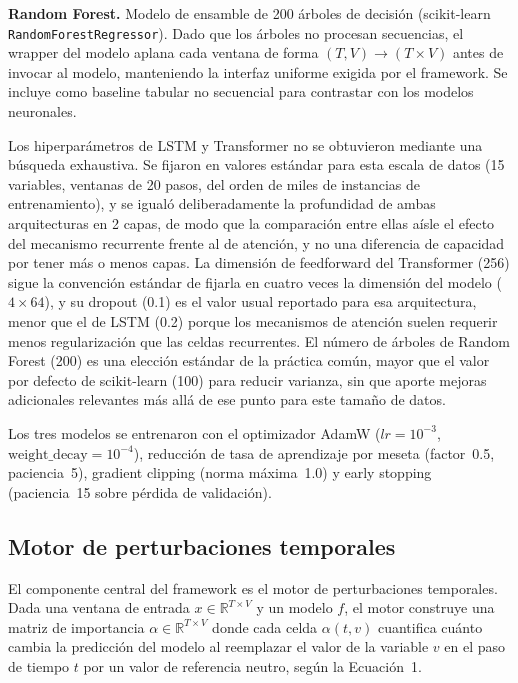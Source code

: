 \documentclass[conference, letterpaper]{IEEEtran}
\begin{document}
\textbf{Random Forest.} Modelo de ensamble de 200 árboles de
decisión (scikit-learn \texttt{RandomForestRegressor}). Dado que
los árboles no procesan secuencias, el wrapper del modelo aplana
cada ventana de forma $(T, V) \rightarrow (T \times V)$ antes de
invocar al modelo, manteniendo la interfaz uniforme exigida por
el framework. Se incluye como baseline tabular no secuencial para
contrastar con los modelos neuronales.

Los hiperparámetros de LSTM y Transformer no se obtuvieron mediante
una búsqueda exhaustiva. Se fijaron en valores estándar para esta
escala de datos (15 variables, ventanas de 20 pasos, del orden de
miles de instancias de entrenamiento), y se igualó deliberadamente
la profundidad de ambas arquitecturas en 2 capas, de modo que la
comparación entre ellas aísle el efecto del mecanismo recurrente
frente al de atención, y no una diferencia de capacidad por tener
más o menos capas. La dimensión de feedforward del Transformer
(256) sigue la convención estándar de fijarla en cuatro veces la
dimensión del modelo ($4 \times 64$), y su dropout (0.1) es el
valor usual reportado para esa arquitectura, menor que el de LSTM
(0.2) porque los mecanismos de atención suelen requerir menos
regularización que las celdas recurrentes. El número de árboles de
Random Forest (200) es una elección estándar de la práctica común,
mayor que el valor por defecto de scikit-learn (100) para reducir
varianza, sin que aporte mejoras adicionales relevantes más allá de
ese punto para este tamaño de datos.

Los tres modelos se entrenaron con el optimizador AdamW
($lr=10^{-3}$, $\text{weight\_decay}=10^{-4}$), reducción de 
tasa de aprendizaje por meseta (factor~0.5, paciencia~5), 
gradient clipping (norma máxima~1.0) y early stopping 
(paciencia~15 sobre pérdida de validación).

\subsection{Motor de perturbaciones temporales}

El componente central del framework es el motor de perturbaciones 
temporales. Dada una ventana de entrada $x \in \mathbb{R}^{T 
\times V}$ y un modelo $f$, el motor construye una matriz de 
importancia $\alpha \in \mathbb{R}^{T \times V}$ donde cada celda 
$\alpha(t, v)$ cuantifica cuánto cambia la predicción del modelo
al reemplazar el valor de la variable $v$ en el paso de tiempo
$t$ por un valor de referencia neutro, según la Ecuación~1.
\end{document}
